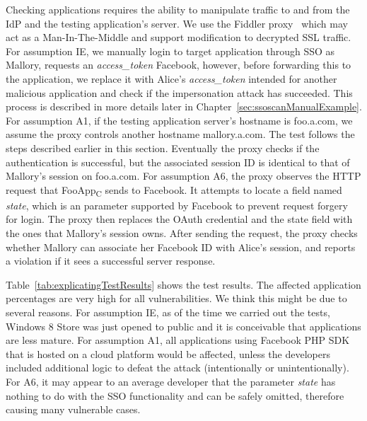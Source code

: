   Checking applications requires the ability to manipulate traffic to and from the IdP and the testing application's server.  We use the Fiddler proxy~\cite{Fiddler} which may act as a Man-In-The-Middle and support modification to decrypted SSL traffic.  For assumption IE, we manually login to target application through SSO as Mallory, requests an \emph{access\_token} Facebook, however, before forwarding this to the application, we replace it with Alice's \emph{access\_token} intended for another malicious application and check if the impersonation attack has succeeded.  This process is described in more details later in Chapter~\ref{sec:ssoscanManualExample}.  For assumption A1, if the testing application server's hostname is foo.a.com, we assume the proxy controls another hostname mallory.a.com.  The test follows the steps described earlier in this section.  Eventually the proxy checks if the authentication is successful, but the associated session ID is identical to that of Mallory’s session on foo.a.com.  For assumption A6, the proxy observes the HTTP request that FooApp\textsubscript{C} sends to Facebook.  It attempts to locate a field named \emph{state}, which is an parameter supported by Facebook to prevent request forgery for login.  The proxy then replaces the OAuth credential and the state field with the ones that Mallory's session owns.  After sending the request, the proxy checks whether Mallory can associate her Facebook ID with Alice's session, and reports a violation if it sees a successful server response.  



 Table~\ref{tab:explicatingTestResults} shows the test results.  The affected application percentages are very high for all vulnerabilities.  We think this might be due to several reasons.  For assumption IE, as of the time we carried out the tests, Windows 8 Store was just opened to public and it is conceivable that applications are less mature.  For assumption A1, all applications using Facebook PHP SDK that is hosted on a cloud platform would be affected, unless the developers included additional logic to defeat the attack (intentionally or unintentionally).  For A6, it may appear to an average developer that the parameter \emph{state} has nothing to do with the SSO functionality and can be safely omitted, therefore causing many vulnerable cases.